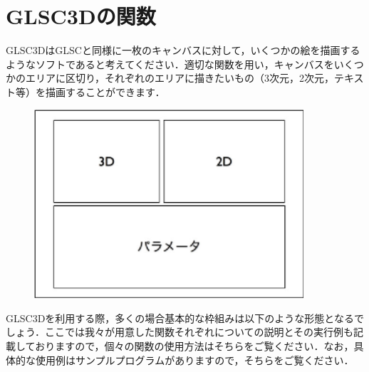 \documentclass[platex,a4paper,12pt]{jsarticle}%
\begin{document}

\newpage
\section{GLSC3Dの関数}

GLSC3DはGLSCと同様に一枚のキャンバスに対して，いくつかの絵を描画するようなソフトであると考えてください．適切な関数を用い，キャンバスをいくつかのエリアに区切り，それぞれのエリアに描きたいもの（3次元，2次元，テキスト等）を描画することができます．
\begin{figure}[htb]
\centering
\includegraphics[width=100mm]{Canvas_kansu_gaiyo.eps}
\end{figure}

GLSC3Dを利用する際，多くの場合基本的な枠組みは以下のような形態となるでしょう．ここでは我々が用意した関数それぞれについての説明とその実行例も記載しておりますので，個々の関数の使用方法はそちらをご覧ください．なお，具体的な使用例はサンプルプログラムがありますので，そちらをご覧ください．\\
\end{document}
